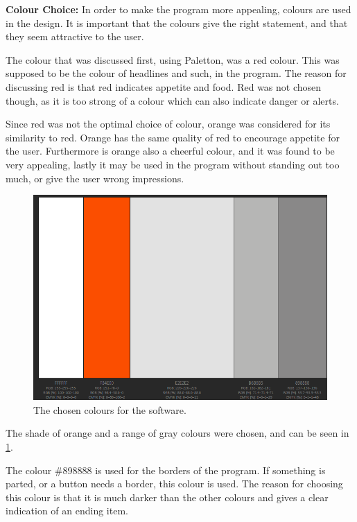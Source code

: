 \textbf{Colour Choice:}
In order to make the program more appealing, colours are used in the design. It is important that the colours give the right statement, and that they seem attractive to the user.

The colour that was discussed first, using Paletton, was a red colour. This was supposed to be the colour of headlines and such, in the program. The reason for discussing red is that red indicates appetite and food\cite{color_psychology}. Red was not chosen though, as it is too strong of a colour which can also indicate danger or alerts.

Since red was not the optimal choice of colour, orange was considered for its similarity to red. Orange has the same quality of red to encourage appetite for the user. Furthermore is orange also a cheerful colour, and it was found to be very appealing, lastly it may be used in the program without standing out too much, or give the user wrong impressions.

\begin{figure}[H]
	\centering
    \includegraphics[width=\textwidth, clip=true, trim=0cm 0cm 0cm 8cm]{Grafik/FoodPlanner/ChosenColours}
	\caption{The chosen colours for the software.}
	\label{ChosenColours}
\end{figure}
The shade of orange and a range of gray colours were chosen, and can be seen in \cref{ChosenColours}.

The colour \#898888 is used for the borders of the program. If something is parted, or a button needs a border, this colour is used. The reason for choosing this colour is that it is much darker than the other colours and gives a clear indication of an ending item.

